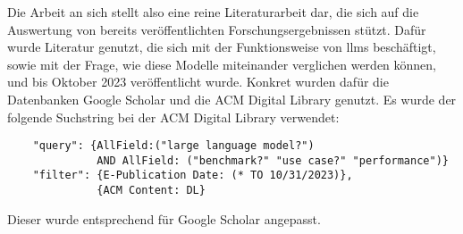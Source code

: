 Die Arbeit an sich stellt also eine reine Literaturarbeit dar, die sich auf die Auswertung von bereits veröffentlichten Forschungsergebnissen stützt.
Dafür wurde Literatur genutzt, die sich mit der Funktionsweise von \acp{llm} beschäftigt, sowie mit der Frage, wie diese Modelle miteinander verglichen werden können, und bis Oktober 2023 veröffentlicht wurde.
Konkret wurden dafür die Datenbanken Google Scholar und die ACM Digital Library genutzt.
Es wurde der folgende Suchstring bei der ACM Digital Library verwendet:
\begin{verbatim}
    "query": {AllField:("large language model?") 
              AND AllField: ("benchmark?" "use case?" "performance")} 
    "filter": {E-Publication Date: (* TO 10/31/2023)},
              {ACM Content: DL}
\end{verbatim}
Dieser wurde entsprechend für Google Scholar angepasst.
